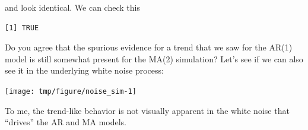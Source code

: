 \begin{frame}[fragile]
 and  look identical. We can check this
\begin{knitrout}\small
{}\color{fgcolor}\begin{kframe}
\begin{alltt}
\hlopt{==}
\end{alltt}
\begin{verbatim}
[1] TRUE
\end{verbatim}
\end{kframe}
\end{knitrout}

Do you agree that the spurious evidence for a trend that we saw for the AR(1) model is still somewhat present for the MA(2) simulation? Let's see if we can also see it in the underlying white noise process:

\begin{knitrout}\small
{}\color{fgcolor}\begin{kframe}
\begin{alltt}
 \hlkwb{<-} 
\hldef{(}\hldef{)}
 \hlkwb{<-} 
\hldef{=}\hldef{)}
\end{alltt}
\end{kframe}
\end{knitrout}

\vspace{-2mm}

\begin{knitrout}\small
{}\color{fgcolor}

{\centering \texttt{[image: tmp/figure/noise\_sim-1]} 

}


\end{knitrout}

To me, the trend-like behavior is not visually apparent in the white noise that ``drives'' the AR and MA models.

\end{frame} 


